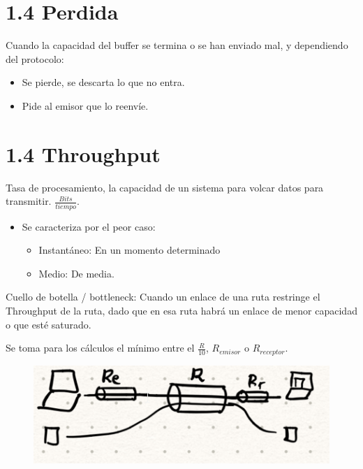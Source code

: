 \documentclass[12pt, twoside, openright]{report} %
\begin{document}
\section{1.4 Perdida}

Cuando la capacidad del buffer se termina o se han enviado mal, y
dependiendo del protocolo:

\begin{itemize}
\item
  Se pierde, se descarta lo que no entra.
\item
  Pide al emisor que lo reenvíe.
\end{itemize}

\section{1.4 Throughput}


  Tasa de procesamiento, la capacidad de un sistema para volcar datos
  para transmitir. \(\frac{Bits}{tiempo}\).

  \begin{itemize}
  \item
    Se caracteriza por el peor caso:

    \begin{itemize}
    \item
      Instantáneo: En un momento determinado
    \item
      Medio: De media.
    \end{itemize}
  \end{itemize}

  Cuello de botella / bottleneck: Cuando un enlace de una ruta restringe
  el Throughput de la ruta, dado que en esa ruta habrá un enlace de
  menor capacidad o que esté saturado.

  Se toma para los cálculos el mínimo entre el \(\frac{R}{10}\),
  \(R_{emisor}\) o \(R_{receptor}\).
  \begin{figure}[H]
	{\includegraphics[scale=.5]{Untitled 2.png}}
\end{figure}
\end{document}

